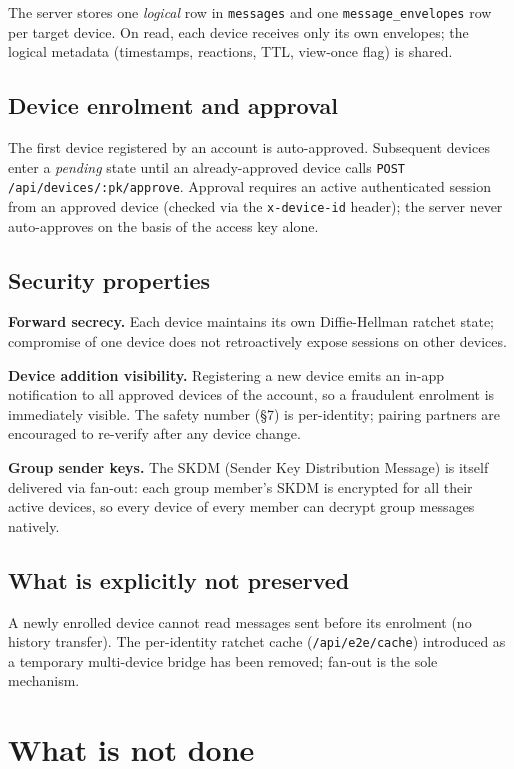 \documentclass[11pt,a4paper]{article}
\newcommand{\code}[1]{\texttt{\small #1}}
\begin{document}
The server stores one \emph{logical} row in \code{messages} and one
\code{message\_envelopes} row per target device.  On read, each device
receives only its own envelopes; the logical metadata (timestamps,
reactions, TTL, view-once flag) is shared.

\subsection*{Device enrolment and approval}

The first device registered by an account is auto-approved.
Subsequent devices enter a \emph{pending} state until an already-approved
device calls \code{POST /api/devices/:pk/approve}.  Approval requires
an active authenticated session from an approved device (checked via the
\code{x-device-id} header); the server never auto-approves on the basis
of the access key alone.

\subsection*{Security properties}

\textbf{Forward secrecy.}  Each device maintains its own Diffie-Hellman
ratchet state; compromise of one device does not retroactively expose
sessions on other devices.

\textbf{Device addition visibility.}  Registering a new device emits an
in-app notification to all approved devices of the account, so a
fraudulent enrolment is immediately visible.  The safety number (§7)
is per-identity; pairing partners are encouraged to re-verify after any
device change.

\textbf{Group sender keys.}  The SKDM (Sender Key Distribution Message)
is itself delivered via fan-out: each group member's SKDM is encrypted
for all their active devices, so every device of every member can decrypt
group messages natively.

\subsection*{What is explicitly not preserved}

A newly enrolled device cannot read messages sent before its enrolment
(no history transfer).  The per-identity ratchet cache
(\code{/api/e2e/cache}) introduced as a temporary multi-device bridge
has been removed; fan-out is the sole mechanism.

\section{What is not done}
\end{document}
